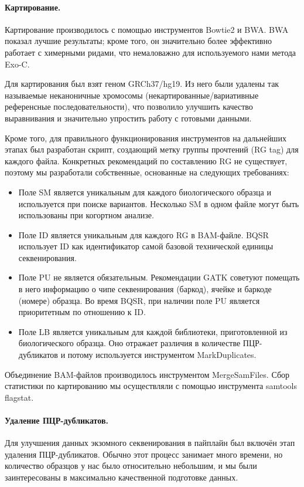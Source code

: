 \documentclass[a4paper,12pt]{article}
\begin{document}
\paragraph{Картирование.}
Картирование производилось с помощью инструментов Bowtie2\cite{bowtie2} и BWA\cite{bwa}.
BWA показал лучшие результаты;
кроме того, он значительно более эффективно работает с химерными ридами, что немаловажно для используемого нами метода Exo-C.

Для картирования был взят геном GRCh37/hg19.
Из него были удалены так называемые неканоничные хромосомы (некартированные/вариативные референсные последовательности), что позволило улучшить качество выравнивания и значительно упростить работу с готовыми данными.

Кроме того, для правильного функционирования инструментов на дальнейших этапах был разработан скрипт, создающий метку группы прочтений (RG tag) для каждого файла.
Конкретных рекомендаций по составлению RG не существует, поэтому мы разработали собственные, основанные на следующих требованиях\cite{gatk}:

\begin{itemize}
\item Поле SM является уникальным для каждого биологического образца и используется при поиске вариантов.
Несколько SM в одном файле могут быть использованы при когортном анализе.
\item Поле ID является уникальным для каждого RG в BAM-файле.
BQSR использует ID как идентификатор самой базовой технической единицы секвенирования.
\item Поле PU не является обязательным.
Рекомендации GATK советуют помещать в него информацию о чипе секвенирования (баркод), ячейке и баркоде (номере) образца.
Во время BQSR, при наличии поле PU является приоритетным по отношению к ID.
\item Поле LB является уникальным для каждой библиотеки, приготовленной из биологического образца.
Оно отражает различия в количестве ПЦР-дубликатов и потому используется инструментом MarkDuplicates.
\end{itemize}

Объединение BAM-файлов производилось инструментом MergeSamFiles.
Сбор статистики по картированию мы осуществляли с помощью инструмента samtools flagstat.

\paragraph{Удаление ПЦР-дубликатов.}
Для улучшения данных экзомного секвенирования в пайплайн был включён этап удаления ПЦР-дубликатов.
Обычно этот процесс занимает много времени, но количество образцов у нас было относительно небольшим, и мы были заинтересованы в максимально качественной подготовке данных.
\end{document}
